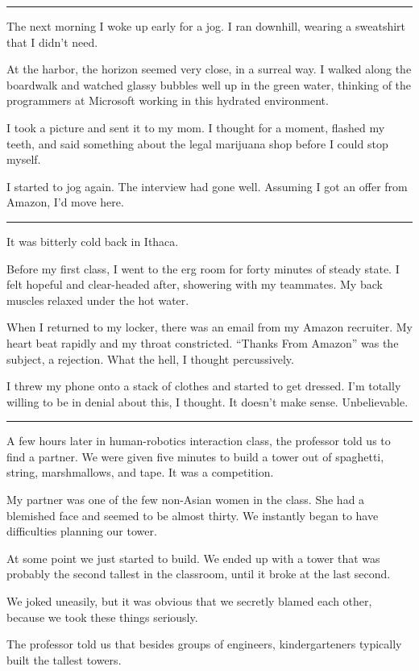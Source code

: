\plainfancybreak{12pt}{2}{}

The next morning I woke up early for a jog.  I ran downhill, wearing a
sweatshirt that I didn't need.

At the harbor, the horizon seemed very close, in a surreal way.  I walked along
the boardwalk and watched glassy bubbles well up in the green water, thinking of
the programmers at Microsoft working in this hydrated environment.

I took a picture and sent it to my mom.  I thought for a moment, flashed my
teeth, and said something about the legal marijuana shop before I could stop
myself.

I started to jog again.  The interview had gone well.  Assuming I got an offer
from Amazon, I'd move here. 

\plainfancybreak{12pt}{2}{}

It was bitterly cold back in Ithaca.

Before my first class, I went to the erg room for forty minutes of steady state.
I felt hopeful and clear-headed after, showering with my teammates.  My back
muscles relaxed under the hot water.

When I returned to my locker, there was an email from my Amazon recruiter.  My
heart beat rapidly and my throat constricted.  ``Thanks From Amazon'' was the
subject, a rejection.  What the hell, I thought percussively. 

I threw my phone onto a stack of clothes and started to get dressed.  I'm
totally willing to be in denial about this, I thought.  It doesn't make sense.
Unbelievable. 

\plainfancybreak{12pt}{2}{}

A few hours later in human-robotics interaction class, the professor told us to find a
partner.  We were given five minutes to build a tower out of spaghetti, string,
marshmallows, and tape.  It was a competition.

My partner was one of the few non-Asian women in the class.  She had a blemished
face and seemed to be almost thirty.  We instantly began to have difficulties
planning our tower.

At some point we just started to build.  We ended up with a tower that was
probably the second tallest in the classroom, until it broke at the last second.

We joked uneasily, but it was obvious that we secretly blamed each other,
because we took these things seriously.

The professor told us that besides groups of engineers, kindergarteners
typically built the tallest towers.

